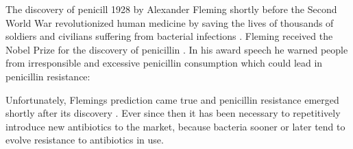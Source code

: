 The discovery of penicill 1928 by Alexander Fleming shortly before the Second World War revolutionized human medicine by saving the lives of thousands of soldiers and civilians suffering from bacterial infections \cite{cdc_biggest_2019}. Fleming received the Nobel Prize for the discovery of penicillin \cite{fleming}. In his award speech he warned people from irresponsible and excessive penicillin consumption which could lead in penicillin resistance:

 
 
Unfortunately, Flemings prediction came true and penicillin resistance emerged shortly after its discovery \cite{lobanovska_penicillins_2017}. Ever since then it has been necessary to repetitively introduce new antibiotics to the market, because bacteria sooner or later tend to evolve resistance to antibiotics in use. 

